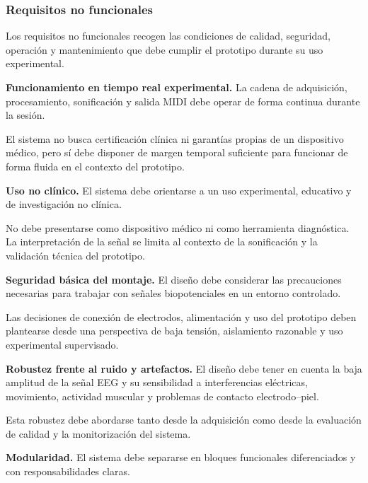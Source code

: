 \documentclass[../main.tex]{subfiles}
\begin{document}
\subsubsection{Requisitos no funcionales}

Los requisitos no funcionales recogen las condiciones de calidad, seguridad, operación y mantenimiento que debe cumplir el prototipo durante su uso experimental.

\begin{description}[leftmargin=!,labelwidth=2.2cm]

    \item[RNF-1] \textbf{Funcionamiento en tiempo real experimental.} La cadena de adquisición, procesamiento, sonificación y salida MIDI debe operar de forma continua durante la sesión.

    El sistema no busca certificación clínica ni garantías propias de un dispositivo médico, pero sí debe disponer de margen temporal suficiente para funcionar de forma fluida en el contexto del prototipo.

    \item[RNF-2] \textbf{Uso no clínico.} El sistema debe orientarse a un uso experimental, educativo y de investigación no clínica.

    No debe presentarse como dispositivo médico ni como herramienta diagnóstica. La interpretación de la señal se limita al contexto de la sonificación y la validación técnica del prototipo.

    \item[RNF-3] \textbf{Seguridad básica del montaje.} El diseño debe considerar las precauciones necesarias para trabajar con señales biopotenciales en un entorno controlado.

    Las decisiones de conexión de electrodos, alimentación y uso del prototipo deben plantearse desde una perspectiva de baja tensión, aislamiento razonable y uso experimental supervisado.

    \item[RNF-4] \textbf{Robustez frente al ruido y artefactos.} El diseño debe tener en cuenta la baja amplitud de la señal EEG y su sensibilidad a interferencias eléctricas, movimiento, actividad muscular y problemas de contacto electrodo--piel.

    Esta robustez debe abordarse tanto desde la adquisición como desde la evaluación de calidad y la monitorización del sistema.

    \item[RNF-5] \textbf{Modularidad.} El sistema debe separarse en bloques funcionales diferenciados y con responsabilidades claras.


\end{description}
\end{document}
